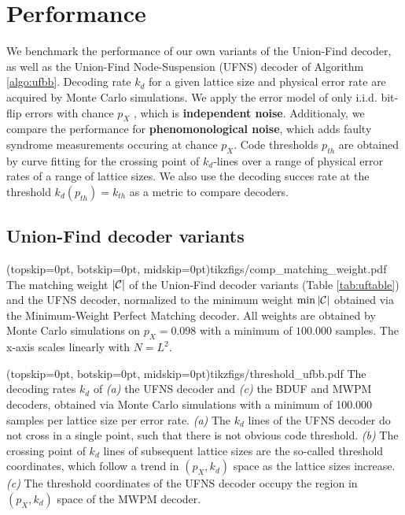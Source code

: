\section{Performance}\label{sec:performance}

We benchmark the performance of our own variants of the Union-Find decoder, as well as the Union-Find Node-Suspension (UFNS) decoder of Algorithm \ref{algo:ufbb}. Decoding rate $k_d$ for a given lattice size and physical error rate are acquired by Monte Carlo simulations. We apply the error model of only i.i.d. bit-flip errors with chance $p_X$ , which is \textbf{independent noise}. Additionaly, we compare the performance for \textbf{phenomonological noise}, which adds faulty syndrome measurements occuring at chance $p_X$. Code thresholds $p_{th}$ are obtained by curve fitting for the crossing point of $k_d$-lines over a range of physical error rates of a range of lattice sizes. We also use the decoding succes rate at the threshold $k_d(p_{th})= k_{th}$ as a metric to compare decoders. 

\subsection{Union-Find decoder variants}

\Figure[htb](topskip=0pt, botskip=0pt, midskip=0pt){tikzfigs/comp_matching_weight.pdf}{
  The matching weight $\lvert\mathcal{C}\rvert$ of the Union-Find decoder variants (Table \ref{tab:uftable}) and the UFNS decoder, normalized to the minimum weight $\min{\lvert\mathcal{C}\rvert}$ obtained via the Minimum-Weight Perfect Matching decoder. All weights are obtained by Monte Carlo simulations on $p_X=0.098$ with a minimum of $100.000$ samples. The x-axis scales linearly with $N = L^2$. \label{comp_weight}}

\Figure[htb](topskip=0pt, botskip=0pt, midskip=0pt){tikzfigs/threshold_ufbb.pdf}{
  The decoding rates $k_d$ of \emph{(a)} the UFNS decoder and \emph{(c)} the BDUF and MWPM decoders, obtained via Monte Carlo simulations with a minimum of 100.000 samples per lattice size per error rate. \emph{(a)} The $k_d$ lines of the UFNS decoder do not cross in a single point, such that there is not obvious code threshold. \emph{(b)} The crossing point of $k_d$ lines of subsequent lattice sizes are the so-called threshold coordinates, which follow a trend in $(p_X, k_d)$ space as the lattice sizes increase. \emph{(c)} The threshold coordinates of the UFNS decoder occupy the region in $(p_X, k_d)$ space of the MWPM decoder. \label{threshold_ufbb}}

